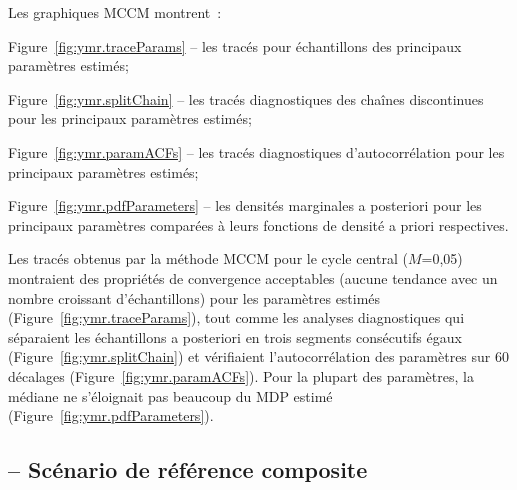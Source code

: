 \documentclass[11pt]{book}
\begin{document}
Les graphiques MCCM montrent~:
\begin{itemize_csas}{}{}
\item Figure~\ref{fig:ymr.traceParams} -- les trac\'{e}s pour \Nmcmc{} \'{e}chantillons des principaux param\`{e}tres estim\'{e}s;
\item Figure~\ref{fig:ymr.splitChain} -- les trac\'{e}s diagnostiques des cha\^{i}nes discontinues pour les principaux param\`{e}tres estim\'{e}s;
\item Figure~\ref{fig:ymr.paramACFs} -- les trac\'{e}s diagnostiques d'autocorr\'{e}lation pour les principaux param\`{e}tres estim\'{e}s;
\item Figure~\ref{fig:ymr.pdfParameters} -- les densit\'{e}s marginales a posteriori pour les principaux param\`{e}tres compar\'{e}es \`{a} leurs fonctions de densit\'{e} a priori respectives.
\end{itemize_csas}

Les trac\'{e}s obtenus par la m\'{e}thode MCCM pour le cycle central ($M$=0,05) montraient des propri\'{e}t\'{e}s de convergence acceptables (aucune tendance avec un nombre croissant d'\'{e}chantillons) pour les param\`{e}tres estim\'{e}s (Figure~\ref{fig:ymr.traceParams}), tout comme les analyses diagnostiques qui s\'{e}paraient les \'{e}chantillons a posteriori en trois segments cons\'{e}cutifs \'{e}gaux (Figure~\ref{fig:ymr.splitChain}) et v\'{e}rifiaient l'autocorr\'{e}lation des param\`{e}tres sur 60 d\'{e}calages (Figure~\ref{fig:ymr.paramACFs}).
Pour la plupart des param\`{e}tres, la m\'{e}diane ne s'\'{e}loignait pas beaucoup du MDP estim\'{e} (Figure~\ref{fig:ymr.pdfParameters}).

\graphicspath{{C:/Users/haighr/Files/GFish/PSARC/PSARC_2020s/PSARC21/YMR/Data/SS/YMR2021/Run75/MCMC.75.01.nuts4K/french/}}

\subsection {\SPC{} -- Sc\'{e}nario de r\'{e}f\'{e}rence composite}
\end{document}
